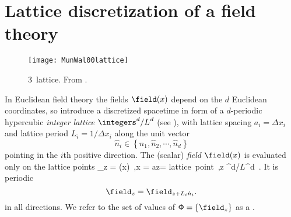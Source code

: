 

\renewcommand{\shift}{\ensuremath{r}}
\renewcommand{\Xx}{\ensuremath{\mathsf{\Phi}}}      %
\renewcommand{\Laplacian}{\square}
\renewcommand\speriod[1]{{\ensuremath{L_{#1}}}}  %
\renewcommand\period[1]{{\ensuremath{T_{#1}}}}  %
\renewcommand{\Tr}{\mbox{\rm Tr}\,}

\section{Lattice discretization of a field theory}
\label{sect:lattDisc}



\begin{figure}
  \centering
  \texttt{[image: MunWal00lattice]}
  \caption{
3\dmn\ lattice. From .
  }\label{fig:MunWal00lattice}
\end{figure}

In Euclidean field theory the fields $\field(x)$ depend on the $d$ Euclidean
coordinates, so introduce a discretized spacetime in form of a
$d$-periodic hypercubic \emph{integer lattice} $\integers^d/\speriod{}^d$
(see ), with lattice spacing $a_{i}=\Delta
x_{i}$ and lattice period $\speriod{i}=1/\Delta x_{i}$ along the unit
vector
\[
\hat{n}_{i}
    \in
\left\{\hat{n}_1, \hat{n}_2, \cdots , \hat{n}_d\right\}
\]
pointing in the $i$th positive direction. The (scalar) \emph{field}
$\field(x)$ is evaluated only on the lattice points
\beq
\field_z
=
\field(x)
    \,,\qquad \qquad x = az= \mbox{lattice point}
    \,,\quad z \in \integers^d/\speriod{}^d
\,.
It is periodic
\[
\field_z = \field_{z+\speriod{i}\hat{n}_{i}}.
\]
in all directions.
We refer to the set of values of $\Xx=\{\field_z\}$ as a {\em {\lattstate}}.

